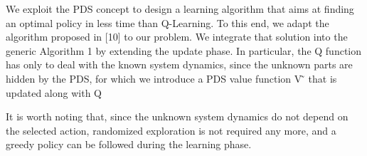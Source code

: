 We exploit the PDS concept to design a learning algorithm that aims at
finding an optimal policy in less time than Q-Learning. To this end, we adapt
the algorithm proposed in [10] to our problem. We integrate that solution into
the generic Algorithm 1 by extending the update phase. In particular, the Q
function has only to deal with the known system dynamics, since the unknown
parts are hidden by the PDS, for which we introduce a PDS value function V  ̃
that is updated along with Q

It is worth noting that, since the unknown system dynamics do not depend on
the selected action, randomized exploration is not required any more, and a
greedy policy can be followed during the learning phase.